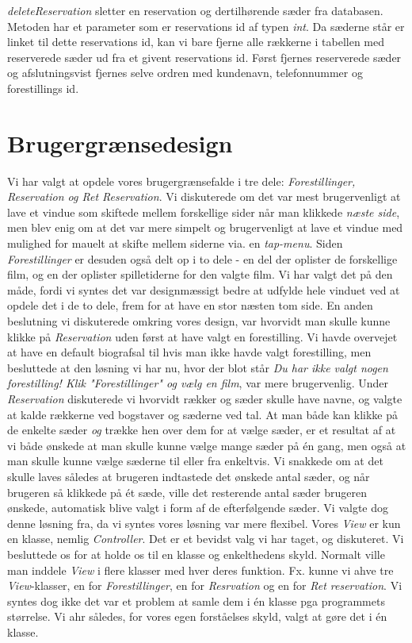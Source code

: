 \documentclass[final]{report}
\begin{document}
\emph{deleteReservation} sletter en reservation og dertilhørende sæder fra databasen. Metoden har et parameter som er reservations id af typen \emph{int}. Da sæderne står er linket til dette reservations id, kan vi bare fjerne alle rækkerne i tabellen med reserverede sæder ud fra et givent reservations id. Først fjernes reserverede sæder og afslutningsvist fjernes selve ordren med kundenavn, telefonnummer og forestillings id. 



\section{Brugergrænsedesign}
Vi har valgt at opdele vores brugergrænsefalde i tre dele: \emph{Forestillinger, Reservation og Ret Reservation}. Vi diskuterede om det var mest brugervenligt at lave et vindue som skiftede mellem forskellige sider når man klikkede \emph{næste side}, men blev enig om at det var mere simpelt og brugervenligt at lave et vindue med mulighed for mauelt at skifte mellem siderne via. en \emph{tap-menu}. Siden \emph{Forestillinger} er desuden også delt op i to dele - en del der oplister de forskellige film, og en der oplister spilletiderne for den valgte film. Vi har valgt det på den måde, fordi vi syntes det var designmæssigt bedre at udfylde hele vinduet ved at opdele det i de to dele, frem for at have en stor næsten tom side. 
En anden beslutning vi diskuterede omkring vores design, var hvorvidt man skulle kunne klikke på \emph{Reservation} uden først at have valgt en forestilling. Vi havde overvejet at have en default biografsal til hvis man ikke havde valgt forestilling, men besluttede at den løsning vi har nu, hvor der blot står \emph{Du har ikke valgt nogen forestilling! Klik "Forestillinger" og vælg en film}, var mere brugervenlig. 
Under \emph{Reservation} diskuterede vi hvorvidt rækker og sæder skulle have navne, og valgte at kalde rækkerne ved bogstaver og sæderne ved tal. At man både kan klikke på de enkelte sæder \emph{og} trække hen over dem for at vælge sæder, er et resultat af at vi både ønskede at man skulle kunne vælge mange sæder på én gang, men også at man skulle kunne vælge sæderne til eller fra enkeltvis. Vi snakkede om at det skulle laves således at brugeren indtastede det ønskede antal sæder, og når brugeren så klikkede på ét sæde, ville det resterende antal sæder brugeren ønskede, automatisk blive valgt i form af de efterfølgende sæder. Vi valgte dog denne løsning fra, da vi syntes vores løsning var mere flexibel. 
Vores \emph{View} er kun en klasse, nemlig \emph{Controller}. Det er et bevidst valg vi har taget, og diskuteret. Vi besluttede os for at holde os til en klasse og enkelthedens skyld. Normalt ville man inddele \emph{View} i flere klasser med hver deres funktion. Fx. kunne vi ahve tre \emph{View}-klasser, en for \emph{Forestillinger}, en for \emph{Resrvation} og en for \emph{Ret reservation}. Vi syntes dog ikke det var et problem at samle dem i én klasse pga programmets størrelse. Vi ahr således, for vores egen forståelses skyld, valgt at gøre det i én klasse.
\end{document}
